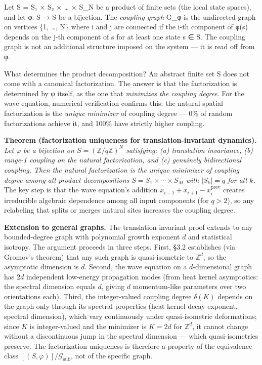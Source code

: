 \documentclass[
]{article}
\begin{document}
Let S = S₁ × S₂ × \ldots{} × S\_N be a product of finite sets (the local
state spaces), and let φ: S → S be a bijection. The \emph{coupling
graph} G\_φ is the undirected graph on vertices \{1, \ldots, N\} where i
and j are connected if the i-th component of φ(s) depends on the j-th
component of s for at least one state s ∈ S. The coupling graph is not
an additional structure imposed on the system --- it is read off from φ.

What determines the product decomposition? An abstract finite set S does
not come with a canonical factorization. The answer is that the
factorization is determined by φ itself, as the one that \emph{minimizes
the coupling degree}. For the wave equation, numerical verification
confirms this: the natural spatial factorization is the \emph{unique
minimizer} of coupling degree --- 0\% of random factorizations achieve
it, and 100\% have strictly higher coupling.

\textbf{Theorem (factorization uniqueness for translation-invariant
dynamics).} \emph{Let \(\varphi\) be a bijection on
\(S = (\mathbb{Z}/q\mathbb{Z})^N\) satisfying: (a) translation
invariance, (b) range-1 coupling on the natural factorization, and (c)
genuinely bidirectional coupling. Then the natural factorization is the
unique minimizer of coupling degree among all product decompositions
\(S = S_1 \times \cdots \times S_M\) with \(|S_k| = q\) for all \(k\).}
The key step is that the wave equation's addition
\(x_{i-1} + x_{i+1} - x_i^{\text{prev}}\) creates irreducible algebraic
dependence among all input components (for \(q > 2\)), so any relabeling
that splits or merges natural sites increases the coupling degree.

\textbf{Extension to general graphs.} The translation-invariant proof
extends to any bounded-degree graph with polynomial growth exponent
\(d\) and statistical isotropy. The argument proceeds in three steps.
First, §3.2 establishes (via Gromov's theorem) that any such graph is
quasi-isometric to \(\mathbb{Z}^d\), so the asymptotic dimension is
\(d\). Second, the wave equation on a \(d\)-dimensional graph has \(2d\)
independent low-energy propagation modes (from heat kernel asymptotics:
the spectral dimension equals \(d\), giving \(d\) momentum-like
parameters over two orientations each). Third, the integer-valued
coupling degree \(\delta(K)\) depends on the graph only through its
spectral properties (heat kernel decay exponent, spectral dimension),
which vary continuously under quasi-isometric deformations; since \(K\)
is integer-valued and the minimizer is \(K = 2d\) for \(\mathbb{Z}^d\),
it cannot change without a discontinuous jump in the spectral dimension
--- which quasi-isometries preserve. The factorization uniqueness is
therefore a property of the equivalence class
\([(S, \varphi)]/\mathcal{G}_{\text{sub}}\), not of the specific graph.
\end{document}
